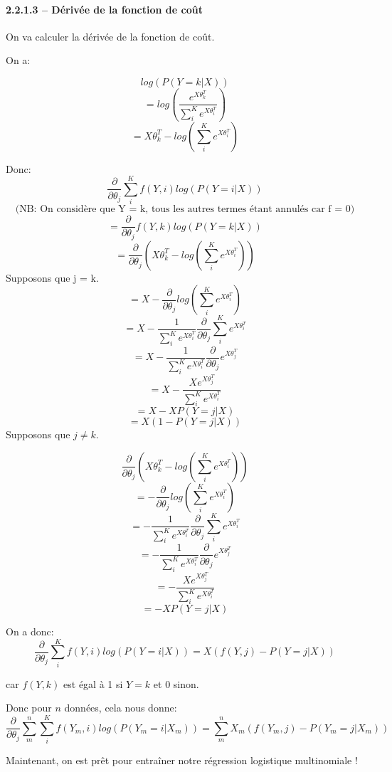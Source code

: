 \documentclass[
]{article}
\begin{document}
\paragraph{2.2.1.3 -- Dérivée de la fonction de
coût}\label{duxe9rivuxe9e-de-la-fonction-de-couxfbt}

On va calculer la dérivée de la fonction de coût.

On a:

\[log(P(Y = k | X))\]
\[=log\left(\frac{e^{X \theta_k^T}}{\sum_i^K e^{X\theta_i^T}}\right)\]
\[=X \theta_k^T - log\left(\sum_i^K e^{X \theta_i^T}\right)\]

Donc:
\[\frac{\partial}{\partial \theta_{j}} \sum_i^K f(Y, i)log(P(Y = i | X))\]
\[\text{(NB: On considère que Y = k, tous les autres termes étant annulés car f = 0)}\]
\[=\frac{\partial}{\partial \theta_{j}} f(Y, k)log(P(Y = k | X))\]
\[=\frac{\partial}{\partial \theta_{j}} \left(X \theta_{k}^T - log\left(\sum_i^K e^{X \theta_i^T}\right)\right) \]
Supposons que j = k.
\[=X - \frac{\partial}{\partial \theta_{j}}log\left(\sum_i^K e^{X \theta_i^T}\right) \]
\[=X - \frac{1}{\sum_i^K e^{X \theta_i^T}} \frac{\partial}{\partial \theta_{j}}\sum_i^K e^{X \theta_i^T} \]
\[=X - \frac{1}{\sum_i^K e^{X \theta_i^T}} \frac{\partial}{\partial \theta_{j}}e^{X \theta_j^T}\]
\[=X - \frac{X e^{X \theta_j^T}}{\sum_i^K e^{X \theta_i^T}}\]
\[=X - X P(Y = j | X)\] \[=X (1 - P(Y = j | X))\] Supposons que
\(j \neq k\).

\[\frac{\partial}{\partial \theta_{j}} \left(X \theta_{k}^T - log\left(\sum_i^K e^{X \theta_i^T}\right)\right) \]
\[= - \frac{\partial}{\partial \theta_{j}}log\left(\sum_i^K e^{X \theta_i^T}\right) \]
\[= - \frac{1}{\sum_i^K e^{X \theta_i^T}} \frac{\partial}{\partial \theta_{j}}\sum_i^K e^{X \theta_i^T} \]
\[= - \frac{1}{\sum_i^K e^{X \theta_i^T}} \frac{\partial}{\partial \theta_{j}}e^{X \theta_j^T} \]
\[= - \frac{Xe^{X \theta_j^T}}{\sum_i^K e^{X \theta_i^T}} \]
\[= -X P(Y = j | X)\]

On a donc:
\[\frac{\partial}{\partial \theta_{j}} \sum_i^K f(Y, i)log(P(Y = i | X)) = X(f(Y, j) - P(Y = j|X))\]

car \(f(Y, k)\) est égal à 1 si \(Y = k\) et 0 sinon.

Donc pour \(n\) données, cela nous donne:
\[\frac{\partial}{\partial \theta_{j}} \sum_m^n \sum_i^K f(Y_m, i)log(P(Y_m = i | X_m)) = \sum_m^n X_m(f(Y_m, j) - P(Y_m = j|X_m))\]

Maintenant, on est prêt pour entraîner notre régression logistique
multinomiale !
\end{document}
